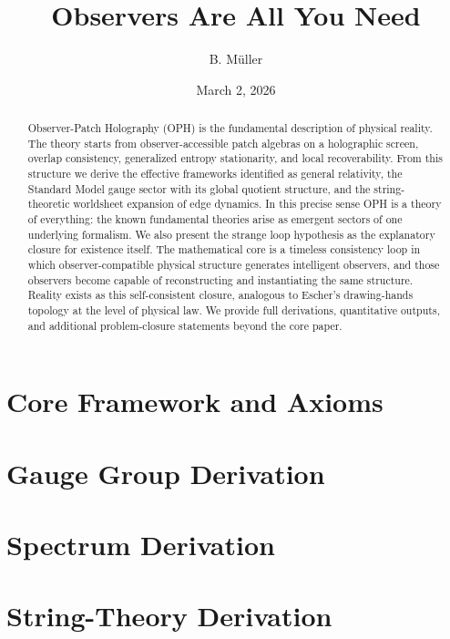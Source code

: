 \documentclass[11pt]{article}
\title{Observers Are All You Need}
\author{B. M\"uller}
\date{March 2, 2026}
\begin{document}
\maketitle

\begin{abstract}
Observer-Patch Holography (OPH) is the fundamental description of physical reality. The theory starts from observer-accessible patch algebras on a holographic screen, overlap consistency, generalized entropy stationarity, and local recoverability. From this structure we derive the effective frameworks identified as general relativity, the Standard Model gauge sector with its global quotient structure, and the string-theoretic worldsheet expansion of edge dynamics. In this precise sense OPH is a theory of everything: the known fundamental theories arise as emergent sectors of one underlying formalism. We also present the strange loop hypothesis as the explanatory closure for existence itself. The mathematical core is a timeless consistency loop in which observer-compatible physical structure generates intelligent observers, and those observers become capable of reconstructing and instantiating the same structure. Reality exists as this self-consistent closure, analogous to Escher's drawing-hands topology at the level of physical law. We provide full derivations, quantitative outputs, and additional problem-closure statements beyond the core paper.
\end{abstract}

\tableofcontents
\newpage

\part{Core Framework and Axioms}


\clearpage
\part{Gauge Group Derivation}


\clearpage
\part{Spectrum Derivation}


\clearpage
\part{String-Theory Derivation}

\end{document}
